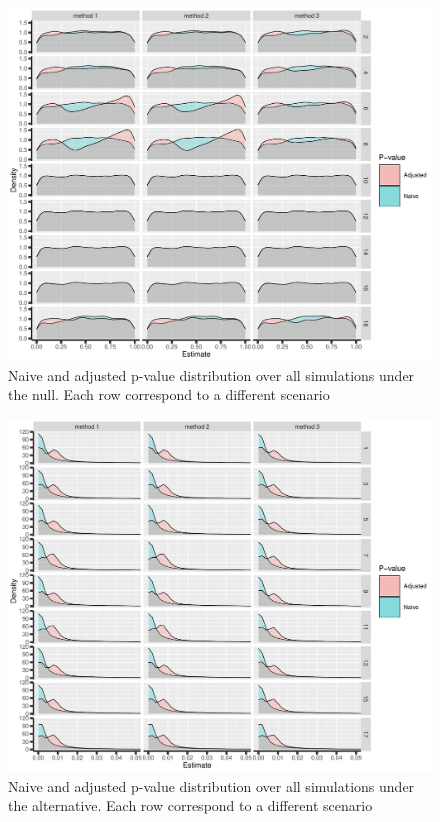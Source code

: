 \documentclass[12pt]{article}
\begin{document}
\begin{figure}[!h]
\centering
\includegraphics[trim={0 0 0 0},width=1\textwidth]{./figures/gg2stage-pvalue-density.pdf}
\caption{Naive and adjusted p-value distribution over all simulations under the null. Each row correspond to a different scenario}
\end{figure}

\begin{figure}[!h]
\centering
\includegraphics[trim={0 0 0 0},width=1\textwidth]{./figures/gg2stage-pvalue2-density.pdf}
\caption{Naive and adjusted p-value distribution over all simulations under the alternative. Each row correspond to a different scenario}
\end{figure}
\end{document}
